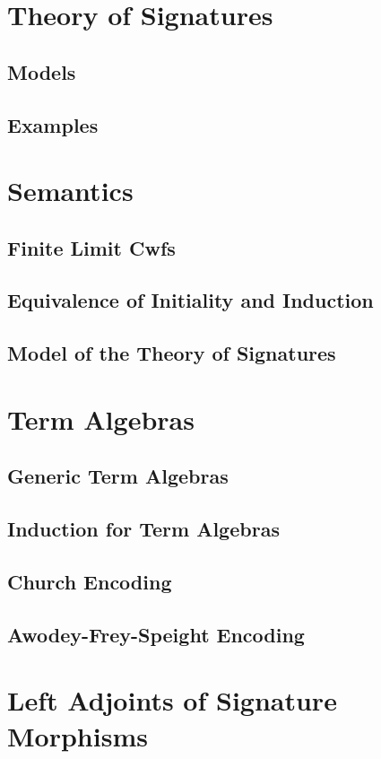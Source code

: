 \documentclass[12pt,a4paper,twoside,openany]{book}
\theoremstyle{remark}
\theoremstyle{definition}
\begin{document}
\section{Theory of Signatures}
\label{sec:fqiit-tos}

\subsection{Models}
\subsection{Examples}

\section{Semantics}
\label{sec:fqiit-semantics}
\subsection{Finite Limit Cwfs}
\subsection{Equivalence of Initiality and Induction}
\subsection{Model of the Theory of Signatures}

\section{Term Algebras}
\label{sec:fqiit-term-algebras}
\subsection{Generic Term Algebras}
\subsection{Induction for Term Algebras}
\subsection{Church Encoding}
\subsection{Awodey-Frey-Speight Encoding}

\section{Left Adjoints of Signature Morphisms}
\end{document}
